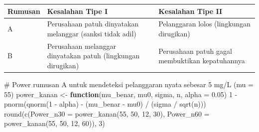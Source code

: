 \documentclass[
  indonesian,
  letterpaper,
]{book}
\newenvironment{Shaded}{\begin{snugshade}}{\end{snugshade}}
\newcommand{\AttributeTok}[1]{\textcolor[rgb]{0.40,0.45,0.13}{#1}}
\newcommand{\CommentTok}[1]{\textcolor[rgb]{0.37,0.37,0.37}{#1}}
\newcommand{\ControlFlowTok}[1]{\textcolor[rgb]{0.00,0.23,0.31}{\textbf{#1}}}
\newcommand{\DecValTok}[1]{\textcolor[rgb]{0.68,0.00,0.00}{#1}}
\newcommand{\FloatTok}[1]{\textcolor[rgb]{0.68,0.00,0.00}{#1}}
\newcommand{\FunctionTok}[1]{\textcolor[rgb]{0.28,0.35,0.67}{#1}}
\newcommand{\NormalTok}[1]{\textcolor[rgb]{0.00,0.23,0.31}{#1}}
\newcommand{\OtherTok}[1]{\textcolor[rgb]{0.00,0.23,0.31}{#1}}
\newcommand{\SpecialCharTok}[1]{\textcolor[rgb]{0.37,0.37,0.37}{#1}}
\newcounter{none} %
\begin{document}
{\def\LTcaptype{none} %
\begin{longtable}[]{@{}
  >{\centering\arraybackslash}p{}
  >{\raggedright\arraybackslash}p{}
  >{\raggedright\arraybackslash}p{}@{}}
\toprule\noalign{}
\begin{minipage}[b]{\linewidth}\centering
Rumusan
\end{minipage} & \begin{minipage}[b]{\linewidth}\raggedright
Kesalahan Tipe I
\end{minipage} & \begin{minipage}[b]{\linewidth}\raggedright
Kesalahan Tipe II
\end{minipage} \\
\midrule\noalign{}
\endhead
\bottomrule\noalign{}
\endlastfoot
A & Perusahaan patuh dinyatakan melanggar (sanksi tidak adil) &
Pelanggaran lolos (lingkungan dirugikan) \\
B & Perusahaan melanggar dinyatakan patuh (lingkungan dirugikan) &
Perusahaan patuh gagal membuktikan kepatuhannya \\
\end{longtable}
}

\begin{Shaded}
\begin{Highlighting}[]
\CommentTok{\# Power rumusan A untuk mendeteksi pelanggaran nyata sebesar 5 mg/L (mu = 55)}
\NormalTok{power\_kanan }\OtherTok{\textless{}{-}} \ControlFlowTok{function}\NormalTok{(mu\_benar, mu0, sigma, n, }\AttributeTok{alpha =} \FloatTok{0.05}\NormalTok{)}
  \DecValTok{1} \SpecialCharTok{{-}} \FunctionTok{pnorm}\NormalTok{(}\FunctionTok{qnorm}\NormalTok{(}\DecValTok{1} \SpecialCharTok{{-}}\NormalTok{ alpha) }\SpecialCharTok{{-}}\NormalTok{ (mu\_benar }\SpecialCharTok{{-}}\NormalTok{ mu0) }\SpecialCharTok{/}\NormalTok{ (sigma }\SpecialCharTok{/} \FunctionTok{sqrt}\NormalTok{(n)))}
\FunctionTok{round}\NormalTok{(}\FunctionTok{c}\NormalTok{(}\AttributeTok{Power\_n30 =} \FunctionTok{power\_kanan}\NormalTok{(}\DecValTok{55}\NormalTok{, }\DecValTok{50}\NormalTok{, }\DecValTok{12}\NormalTok{, }\DecValTok{30}\NormalTok{),}
        \AttributeTok{Power\_n60 =} \FunctionTok{power\_kanan}\NormalTok{(}\DecValTok{55}\NormalTok{, }\DecValTok{50}\NormalTok{, }\DecValTok{12}\NormalTok{, }\DecValTok{60}\NormalTok{)), }\DecValTok{3}\NormalTok{)}
\end{Highlighting}
\end{Shaded}
\end{document}
